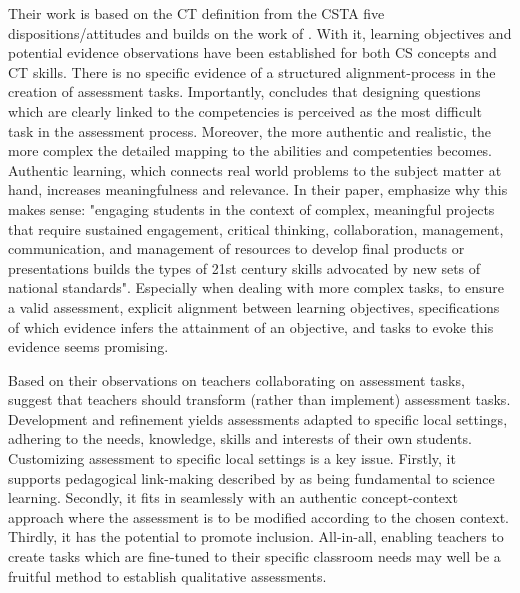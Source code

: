 Their work is based on the CT definition from the CSTA five dispositions/attitudes and builds on the work of . With it, learning objectives and potential evidence observations have been established for both CS concepts and CT skills. There is no specific evidence of a structured alignment-process in the creation of assessment tasks. Importantly,  concludes that designing questions which are clearly linked to the competencies is perceived as the most difficult task in the assessment process. Moreover, the more authentic and realistic, the more complex the detailed mapping to the abilities and competenties becomes. Authentic learning, which connects real world problems to the subject matter at hand, increases meaningfulness and relevance. In their paper,  emphasize why this makes sense: "engaging students in the context of complex, meaningful projects that require sustained engagement, critical thinking, collaboration, management, communication, and management of resources to develop final products or presentations builds the types of 21st century skills advocated by new sets of national standards". Especially when dealing with more complex tasks, to ensure a valid assessment, explicit alignment between learning objectives, specifications of which evidence infers the attainment of an objective, and tasks to evoke this evidence seems promising.


Based on their observations on teachers collaborating on assessment tasks, \citeauthor{hermansen2014reworking} suggest that teachers should transform (rather than implement) assessment tasks. Development and refinement yields assessments adapted to specific local settings, adhering to the needs, knowledge, skills and interests of their own students. Customizing assessment to specific local settings is a key issue. Firstly, it supports pedagogical link-making described by  as being fundamental to science learning. Secondly, it fits in seamlessly with an authentic concept-context approach where the assessment is to be modified according to the chosen context. Thirdly, it has the potential to promote inclusion. All-in-all, enabling teachers to create tasks which are fine-tuned to their specific classroom needs may well be a fruitful method to establish qualitative assessments.




